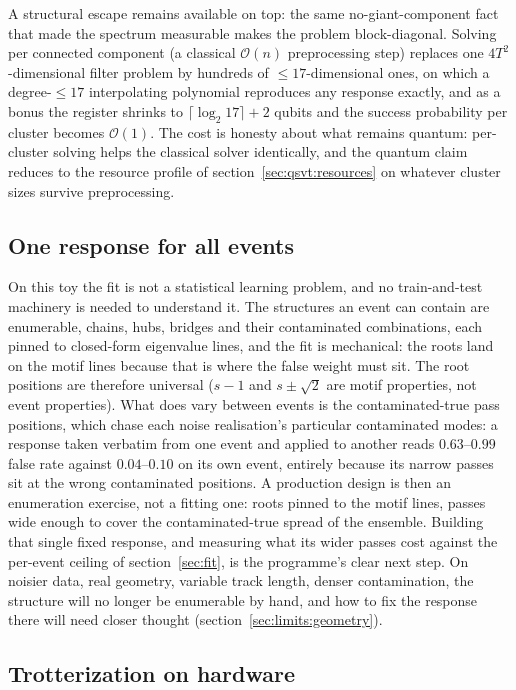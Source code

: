 \documentclass[11pt,a4paper]{article}
\begin{document}
A structural escape remains available on top: the same
no-giant-component fact that made the spectrum measurable makes the
problem block-diagonal. Solving
per connected component (a classical $\mathcal{O}(n)$ preprocessing
step) replaces one $4T^2$-dimensional filter problem by hundreds of
$\le17$-dimensional ones, on which a degree-$\le17$ interpolating
polynomial reproduces any response exactly, and as a bonus the
register shrinks to $\lceil\log_2 17\rceil+2$ qubits and the
success probability per cluster becomes $\mathcal{O}(1)$. The cost
is honesty about what remains quantum: per-cluster solving helps
the classical solver identically, and the quantum claim reduces to
the resource profile of section~\ref{sec:qsvt:resources} on
whatever cluster sizes survive preprocessing.

\subsection{One response for all events}
\label{sec:limits:generalization}

On this toy the fit is not a statistical learning problem, and no
train-and-test machinery is needed to understand it. The structures
an event can contain are enumerable, chains, hubs, bridges and
their contaminated combinations, each pinned to closed-form
eigenvalue lines, and the fit is mechanical: the roots land on
the motif lines because that is where the false weight must sit.
The root positions are therefore universal ($s-1$ and $s\pm\sqrt2$
are motif properties, not event properties). What does vary between
events is the contaminated-true pass positions, which chase each
noise realisation's particular contaminated modes: a response taken
verbatim from one event and applied to another reads $0.63$--$0.99$
false rate against $0.04$--$0.10$ on its own event, entirely
because its narrow passes sit at the wrong contaminated positions.
A production design is then an enumeration exercise, not a fitting
one: roots pinned to the motif lines, passes wide enough to cover
the contaminated-true spread of the ensemble. Building that single
fixed response, and measuring what its wider passes cost against
the per-event ceiling of section~\ref{sec:fit}, is the programme's
clear next step. On noisier data, real geometry, variable track
length, denser contamination, the structure will no longer be
enumerable by hand, and how to fix the response there will need
closer thought (section~\ref{sec:limits:geometry}).

\subsection{Trotterization on hardware}
\label{sec:limits:trotter}
\end{document}
